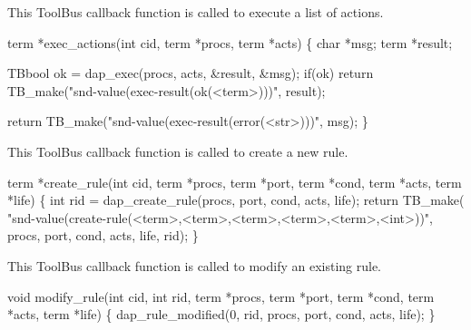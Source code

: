 
This ToolBus callback function is called to execute a list of actions. 

\nwenddocs{}\endmoddef\let\nwnotused=\nwoutput{}
term *exec_actions(int cid, term *procs, term *acts)
\{
  char *msg;
  term *result;

  TBbool ok = dap_exec(procs, acts, &result, &msg);
  if(ok)
    return TB_make("snd-value(exec-result(ok(<term>)))", result);

  return TB_make("snd-value(exec-result(error(<str>)))", msg);
\}
\nwendcode{}\nwdocspar


This ToolBus callback function is called to create a new rule. 

\nwenddocs{}\endmoddef\let\nwnotused=\nwoutput{}
term *create_rule(int cid, term *procs, term *port, term *cond, term *acts, term *life)
\{
  int rid = dap_create_rule(procs, port, cond, acts, life);
  return TB_make(
        "snd-value(create-rule(<term>,<term>,<term>,<term>,<term>,<int>))",
        procs, port, cond, acts, life, rid);
\}
\nwendcode{}\nwdocspar


This ToolBus callback function is called to modify an existing rule. 

\nwenddocs{}\endmoddef\let\nwnotused=\nwoutput{}
void modify_rule(int cid, int rid, term *procs, term *port, 
                                term *cond, term *acts, term *life)
\{
  dap_rule_modified(0, rid, procs, port, cond, acts, life);
\}
\nwendcode{}\nwdocspar


